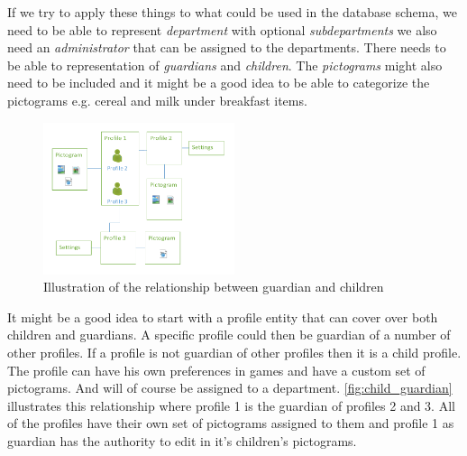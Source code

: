 If we try to apply these things to what could be used in the database schema, we need to be able to represent \emph{department} with optional \emph{subdepartments} we also need an \emph{administrator} that can be assigned to the departments. There needs to be able to representation of \emph{guardians} and \emph{children}. The \emph{pictograms} might also need to be included and it might be a good idea to be able to categorize the pictograms e.g. cereal and milk under breakfast items.

\begin{figure}
	\begin{center}
	\includegraphics[width=0.5\textwidth]{img/child_guardian.pdf}
	\end{center}
	\label{fig:child_guardian}
	\caption{Illustration of the relationship between guardian and children}
\end{figure} 

It might be a good idea to start with a profile entity that can cover over both children and guardians. A specific profile could then be guardian of a number of other profiles. If a profile is not guardian of other profiles then it is a child profile. The profile can have his own preferences in games and have a custom set of pictograms. And will of course be assigned to a department. \autoref{fig:child_guardian} illustrates this relationship where profile 1 is the guardian of profiles 2 and 3. All of the profiles have their own set of pictograms assigned to them and profile 1 as guardian has the authority to edit in it's children's pictograms.


